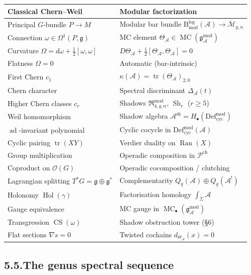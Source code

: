 \documentclass[11pt,reqno]{amsart}
\theoremstyle{definition}
\theoremstyle{remark}
\providecommand{\cA}{\mathcal{A}}
\providecommand{\cM}{\mathcal{M}}
\providecommand{\cO}{\mathcal{O}}
\providecommand{\cP}{\mathcal{P}}
\providecommand{\Defcyc}{\mathrm{Def}_{\mathrm{cyc}}}
\providecommand{\fg}{\mathfrak{g}}
\providecommand{\gAmod}{\mathfrak{g}^{\mathrm{mod}}_\cA}
\providecommand{\Defcyc}{\mathrm{Def}_{\mathrm{cyc}}}
\numberwithin{equation}{section}
\begin{document}
\begin{center}
\renewcommand{\arraystretch}{1.25}
\begin{tabular}{ll}
\textbf{Classical Chern--Weil} & \textbf{Modular factorization}\\
\hline
Principal $G$-bundle $P\to M$ & Modular bar bundle $\mathrm B^{\log}_{\mathrm{mod}}(\cA)\to\overline{\cM}_{g,n}$\\[1pt]
Connection $\omega\in\Omega^1(P,\fg)$ & MC element $\Theta_\cA\in\operatorname{MC}(\gAmod)$\\[1pt]
Curvature $\Omega=d\omega+\tfrac12[\omega,\omega]$ & $D\Theta_\cA+\tfrac12[\Theta_\cA,\Theta_\cA]=0$\\[1pt]
Flatness $\Omega=0$ & Automatic (bar-intrinsic)\\[1pt]
First Chern $c_1$ & $\kappa(\cA)=\operatorname{tr}(\Theta_\cA)_{2,0}$\\[1pt]
Chern character & Spectral discriminant $\Delta_\cA(t)$\\[1pt]
Higher Chern classes $c_r$ & Shadows $\mathfrak R^{\mathrm{mod}}_{4,g,n}$, $\operatorname{Sh}_r$ ($r\ge 5$)\\[1pt]
Weil homomorphism & Shadow algebra $\cA^{\mathrm{sh}}=H_\bullet(\Defcyc^{\mathrm{mod}})$\\[1pt]
$\operatorname{ad}$-invariant polynomial & Cyclic cocycle in $\Defcyc^{\mathrm{mod}}(\cA)$\\[1pt]
Cyclic pairing $\operatorname{tr}(XY)$ & Verdier duality on $\operatorname{Ran}(X)$\\[1pt]
Group multiplication & Operadic composition in $\cP^{\mathrm{ch}}$\\[1pt]
Coproduct on $\cO(G)$ & Operadic cocomposition / clutching\\[1pt]
Lagrangian splitting $T^*G=\fg\oplus\fg^*$ & Complementarity $Q_g(\cA)\oplus Q_g(\cA^!)$\\[1pt]
Holonomy $\operatorname{Hol}(\gamma)$ & Factorisation homology $\int_\Sigma\cA$\\[1pt]
Gauge equivalence & MC gauge in $\operatorname{MC}_\bullet(\gAmod)$\\[1pt]
Transgression $\operatorname{CS}(\omega)$ & Shadow obstruction tower (\S6)\\[1pt]
Flat sections $\nabla s=0$ & Twisted cochains $d_{\Theta_\cA}(x)=0$
\end{tabular}
\end{center}

\subsection*{5.5.\enspace The genus spectral sequence}
\end{document}
